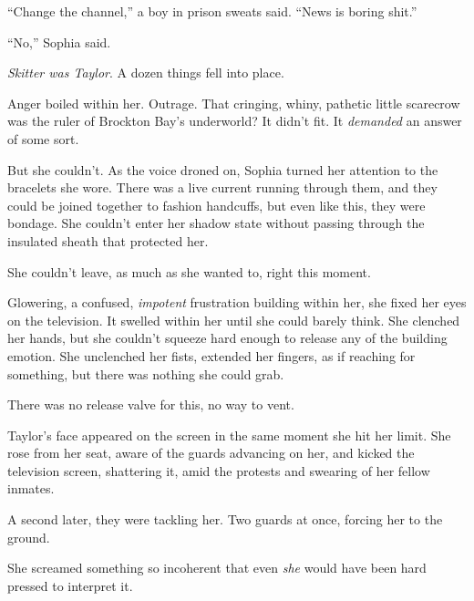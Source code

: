 ``Change the channel,'' a boy in prison sweats said.  ``News is boring shit.''



``No,'' Sophia said.



\emph{Skitter was Taylor}.  A dozen things fell into place.



Anger boiled within her.  Outrage.  That cringing, whiny, pathetic little scarecrow was the ruler of Brockton Bay's underworld?  It didn't fit.  It \emph{demanded} an answer of some sort.



But she couldn't.  As the voice droned on, Sophia turned her attention to the bracelets she wore.  There was a live current running through them, and they could be joined together to fashion handcuffs, but even like this, they were bondage.  She couldn't enter her shadow state without passing through the insulated sheath that protected her.



She couldn't leave, as much as she wanted to, right this moment.



Glowering, a confused, \emph{impotent} frustration building within her, she fixed her eyes on the television.  It swelled within her until she could barely think.  She clenched her hands, but she couldn't squeeze hard enough to release any of the building emotion.  She unclenched her fists, extended her fingers, as if reaching for something, but there was nothing she could grab.



There was no release valve for this, no way to vent.



Taylor's face appeared on the screen in the same moment she hit her limit.  She rose from her seat, aware of the guards advancing on her, and kicked the television screen, shattering it, amid the protests and swearing of her fellow inmates.



A second later, they were tackling her.  Two guards at once, forcing her to the ground.



She screamed something so incoherent that even \emph{she} would have been hard pressed to interpret it.



\blacksquare



